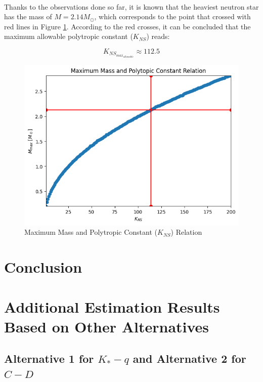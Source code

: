 \documentclass[letterpaper,12pt]{article}
\begin{document}
\paragraph{} Thanks to the observations done so far, it is known that the heaviest neutron star has the mass of $M = 2.14 M_\odot$, which corresponds to the point that crossed with red lines in Figure \ref{fig:20}. According to the red crosses, it can be concluded that the maximum allowable polytropic constant ($K_{NS}$) reads:

\begin{equation*}
    K_{NS_{max_{allowable}}} \approx 112.5
\end{equation*}
\begin{figure}[H] 
\centering \includegraphics[width=0.7\columnwidth]{figures/20_e_s_m_k.png}           
\caption{Maximum Mass and Polytropic Constant ($K_{NS}$) Relation}                
\label{fig:20}
\end{figure}

\section{Conclusion}


\appendix
\section{Additional Estimation Results Based on Other Alternatives}

\subsection{Alternative 1 for $K_* - q$ and Alternative 2 for $C-D$}
\end{document}
